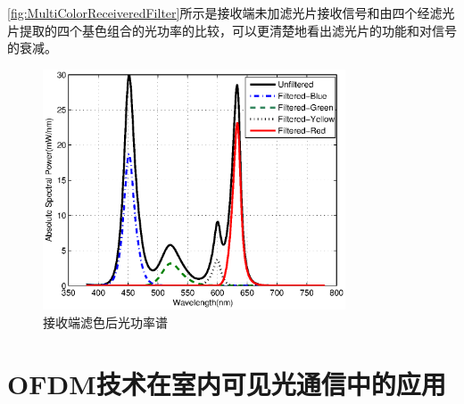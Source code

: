 \autoref{fig:MultiColorReceiveredFilter}所示是接收端未加滤光片接收信号和由四个经滤光片提取的四个基色组合的光功率的比较，可以更清楚地看出滤光片的功能和对信号的衰减。
\begin{figure}[htbp]
    \centering
    \includegraphics[width=0.8\textwidth]{figures/Chapter-2/MultiColorReceiveredFilter.eps}
    \caption{接收端滤色后光功率谱}
    \label{fig:MultiColorReceiveredFilter}
\end{figure}
\section{OFDM技术在室内可见光通信中的应用}
